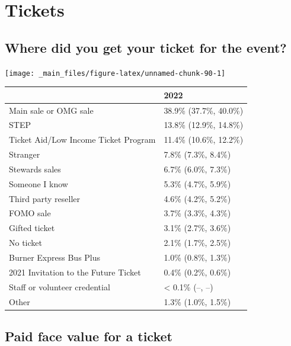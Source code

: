 \documentclass[
]{book}
\begin{document}
\hypertarget{tickets}{%
\section{Tickets}\label{tickets}}

\hypertarget{where-did-you-get-your-ticket-for-the-event}{%
\subsection{Where did you get your ticket for the event?}\label{where-did-you-get-your-ticket-for-the-event}}

\texttt{[image: \_main\_files/figure-latex/unnamed-chunk-90-1]}

\begin{table}
\centering
\begin{tabular}[t]{>{}l|>{}l}
\hline
  & 2022\\
\hline
Main sale or OMG sale & 38.9\% (37.7\%, 40.0\%)\\
\hline
STEP & 13.8\% (12.9\%, 14.8\%)\\
\hline
Ticket Aid/Low Income 
 Ticket Program & 11.4\% (10.6\%, 12.2\%)\\
\hline
Stranger & 7.8\% (7.3\%, 8.4\%)\\
\hline
Stewards sales & 6.7\% (6.0\%, 7.3\%)\\
\hline
Someone I know & 5.3\% (4.7\%, 5.9\%)\\
\hline
Third party reseller & 4.6\% (4.2\%, 5.2\%)\\
\hline
FOMO sale & 3.7\% (3.3\%, 4.3\%)\\
\hline
Gifted ticket & 3.1\% (2.7\%, 3.6\%)\\
\hline
No ticket & 2.1\% (1.7\%, 2.5\%)\\
\hline
Burner Express Bus Plus & 1.0\% (0.8\%, 1.3\%)\\
\hline
2021 Invitation to the 
 Future Ticket & 0.4\% (0.2\%, 0.6\%)\\
\hline
Staff or volunteer 
 credential & < 0.1\% (--, --)\\
\hline
Other & 1.3\% (1.0\%, 1.5\%)\\
\hline
\end{tabular}
\end{table}

\hypertarget{paid-face-value-for-a-ticket}{%
\subsection{Paid face value for a ticket}\label{paid-face-value-for-a-ticket}}
\end{document}

